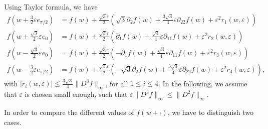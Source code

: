 \documentclass[AHL,Unicode,longabstracts,published]{cedram}
\newcommand{\eps}{\varepsilon}
\begin{document}
Using Taylor formula, we have
\begin{align*}
f\left(w+\frac{3}{2}\eps e_{\pi/2}\right)&=f(w)+\frac{\sqrt{3}\eps}{2}\left(\sqrt{3}\partial_2 f(w)+\frac{3\sqrt{3}}{4}\eps\partial_{22} f(w)+\eps^2r_1(w,\eps)\right)\\
f\left(w+\frac{\sqrt{3}}{2}\eps e_{0}\right)&=f(w)+\frac{\sqrt{3}\eps}{2}\left(\partial_1 f(w)+\frac{\sqrt{3}}{4}\eps \partial_{11} f(w)+\eps^2r_2(w,\eps)\right)\\
f\left(w-\frac{\sqrt{3}}{2}\eps e_{0}\right)&=f(w)+\frac{\sqrt{3}\eps}{2}\left(-\partial_1 f(w)+\frac{\sqrt{3}}{4}\eps\partial_{11} f(w)+\eps^2r_3(w,\eps)\right)\\
f\left(w-\frac{3}{2}\eps e_{\pi/2}\right)&=f(w)+\frac{\sqrt{3}\eps}{2}\left(-\sqrt{3}\partial_2 f(w)+\frac{3\sqrt{3}}{4}\eps\partial_{22} f(w)+\eps^2 r_4(w,\eps)\right),
\end{align*}
with $|r_i(w,\eps)|\le \frac{3\sqrt{3}}{4}\|D^3 f\|_\infty$, for all $1\le i\le 4$. In the following, we assume that $\eps$ is chosen small enough, such that $\eps \|D^3 f\|_\infty\le \|D^2 f\|_\infty$.


In order to compare the different values of $f(w+ \cdot)$, we have to distinguish two cases.
\end{document}
